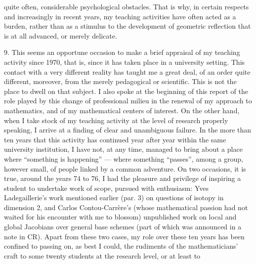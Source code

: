 
quite often, considerable psychological obstacles. That is why,
in certain respects and increasingly in recent years,
my teaching activities have often acted as a burden,
rather than as a stimulus to the development of geometric
reflection that is at all advanced, or merely delicate.

9. This seems an opportune occasion to make a brief
appraisal of my teaching activity since 1970, that is, since
it has taken place in a university setting. This contact
with a very different reality has taught me a great
deal, of an order quite different, moreover, from the
merely pedagogical or scientific. This is not the place to
dwell on that subject. I also spoke at the beginning of this report of the
role played by this change of professional milieu in the
renewal of my approach to mathematics, and of my
mathematical centers of interest. On the other hand, when I take stock
of my teaching activity at the level of research properly
speaking, I arrive at a finding of clear and unambiguous failure. In the more
than ten years that this activity has continued year after year within
the same university institution, I have not, at any time, managed
to bring about a place where ``something is happening'' --- where something
``passes'', among a group, however small, of people
linked by a common adventure. On two occasions, it is true, around
the years 74 to 76, I had the pleasure and privilege of inspiring
a student to undertake work of scope, pursued with enthusiasm:
Yves Ladegaillerie's work mentioned earlier (par. 3) on
questions of isotopy in dimension 2, and Carlos Contou-Carrère's
(whose mathematical passion had not waited for his encounter
with me to blossom) unpublished work on local and global
Jacobians over general base schemes (part of which
was announced in a note in CR). Apart from these two cases,
my role over these ten years has been confined to passing on,
as best I could, the rudiments of the mathematicians' craft to some
twenty students at the research level, or at least to

